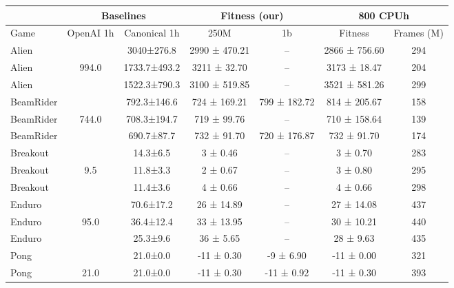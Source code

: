 \begin{sidewaystable}[h]
\begin{small}

\begin{center}
        \begin{tabular}{l|c|c|cc|cc|}

        & \multicolumn{2}{c|}{Baselines} & \multicolumn{2}{c|}{Fitness (our)} & \multicolumn{2}{c}{800 CPUh} \\
\hline
                Game &  OpenAI 1h & Canonical 1h &          250M &           1b &        Fitness &  Frames (M) \\
\hline
\hline
        Alien &       &   3040±276.8 & 2990 ± 470.21 &           -- &  2866 ± 756.60 &         294 \\
        Alien &      994.0 & 1733.7±493.2 &  3211 ± 32.70 &           -- &   3173 ± 18.47 &         204 \\
        Alien &       & 1522.3±790.3 & 3100 ± 519.85 &           -- &  3521 ± 581.26 &         299 \\
\hline
        BeamRider &      &  792.3±146.6 &  724 ± 169.21 & 799 ± 182.72 &   814 ± 205.67 &         158 \\
        BeamRider &      744.0 &  708.3±194.7 &   719 ± 99.76 &           -- &   710 ± 158.64 &         139 \\
        BeamRider &      &   690.7±87.7 &   732 ± 91.70 & 720 ± 176.87 &    732 ± 91.70 &         174 \\
\hline
        Breakout &      &     14.3±6.5 &      3 ± 0.46 &           -- &       3 ± 0.70 &         283 \\
        Breakout &        9.5 &     11.8±3.3 &      2 ± 0.67 &           -- &       3 ± 0.80 &         295 \\
        Breakout &      &     11.4±3.6 &      4 ± 0.66 &           -- &       4 ± 0.66 &         298 \\
\hline
        Enduro &      &    70.6±17.2 &    26 ± 14.89 &           -- &     27 ± 14.08 &         437 \\
        Enduro &       95.0 &    36.4±12.4 &    33 ± 13.95 &           -- &     30 ± 10.21 &         440 \\
        Enduro &      &     25.3±9.6 &     36 ± 5.65 &           -- &      28 ± 9.63 &         435 \\
\hline
                Pong &      &     21.0±0.0 &    -11 ± 0.30 &    -9 ± 6.90 &     -11 ± 0.00 &         321 \\
                Pong &       21.0 &     21.0±0.0 &    -11 ± 0.30 &   -11 ± 0.92 &     -11 ± 0.30 &         393 \\

\end{tabular}
\end{center}
\end{small}
\end{sidewaystable}
